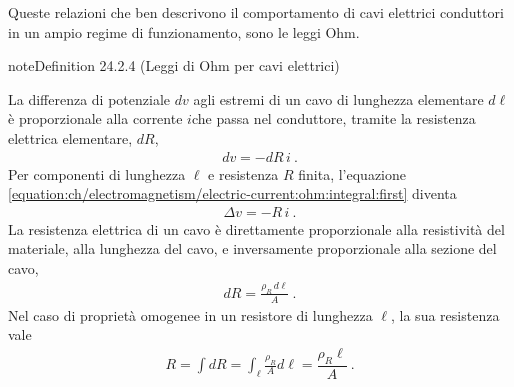 \documentclass[letterpaper,10pt,italian]{jupyterBook}
\begin{document}
\sphinxAtStartPar
Queste relazioni che ben descrivono il comportamento di cavi elettrici conduttori in un ampio regime di funzionamento, sono le leggi Ohm.
\label{ch/electromagnetism/electric-current:ohm-wire}
\begin{sphinxadmonition}{note}{Definition 24.2.4 (Leggi di Ohm per cavi elettrici)}



\sphinxAtStartPar
{} La differenza di potenziale \(dv\) agli estremi di un cavo di lunghezza elementare \(d \ell\) è proporzionale alla corrente \(i\)che passa nel conduttore, tramite la resistenza elettrica elementare, \(d R\),
\begin{equation}\label{equation:ch/electromagnetism/electric-current:ohm:integral:first}
\begin{split}dv = - dR \, i \ .\end{split}
\end{equation}
\sphinxAtStartPar
Per componenti di lunghezza \(\ell\) e resistenza \(R\) finita, l’equazione \eqref{equation:ch/electromagnetism/electric-current:ohm:integral:first} diventa
\begin{equation}\label{equation:ch/electromagnetism/electric-current:ohm:integral:first:R}
\begin{split}\Delta v = - R \, i \ .\end{split}
\end{equation}
\sphinxAtStartPar
{} La resistenza elettrica di un cavo è direttamente proporzionale alla resistività del materiale, alla lunghezza del cavo, e inversamente proporzionale alla sezione del cavo,
\begin{equation}\label{equation:ch/electromagnetism/electric-current:ohm:integral:second}
\begin{split}dR = \frac{\rho_R \, d\ell}{A} \ .\end{split}
\end{equation}
\sphinxAtStartPar
Nel caso di proprietà omogenee in un resistore di lunghezza \(\ell\), la sua resistenza vale
\begin{equation*}
\begin{split}R = \int d R = \int_{\ell} \frac{\rho_R}{A} d \ell = \dfrac{\rho_R \ell}{A} \ .\end{split}
\end{equation*}\end{sphinxadmonition}
\label{ch/electromagnetism/electric-current:resistance-temperature}
\end{document}
